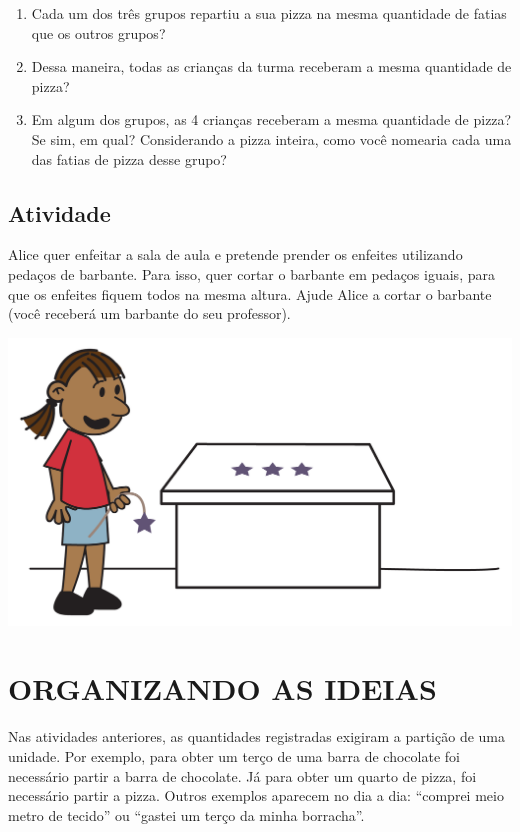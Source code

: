 \begin{enumerate} [\quad a)] %
  \item     Cada um dos três grupos repartiu a sua pizza na mesma quantidade de fatias que os outros grupos?
  \item     Dessa maneira, todas as crianças da turma receberam a mesma quantidade de pizza?
  \item     Em algum dos grupos, as 4 crianças receberam a mesma quantidade de pizza? Se sim, em qual? Considerando a pizza inteira, como você nomearia cada uma das fatias de pizza desse grupo?
\end{enumerate} %

\subsection{Atividade}

Alice quer enfeitar a sala de aula e pretende prender os enfeites utilizando pedaços de barbante. Para isso, quer cortar o barbante em pedaços iguais, para que os enfeites fiquem todos na mesma altura. Ajude Alice a cortar o barbante (você receberá um barbante do seu professor).

\begin{center}
    \includegraphics[width=400pt, keepaspectratio]{../figuras/licao01/ativ3_fig01.png}
  \end{center}


\section{ORGANIZANDO AS IDEIAS }

Nas atividades anteriores, as quantidades registradas exigiram a partição de uma unidade. Por exemplo, para obter um terço de uma barra de chocolate foi necessário partir a barra de chocolate. Já para obter um quarto de pizza, foi necessário partir a pizza. Outros exemplos aparecem no dia a dia: ``comprei meio metro de tecido'' ou ``gastei um terço da minha borracha''.


